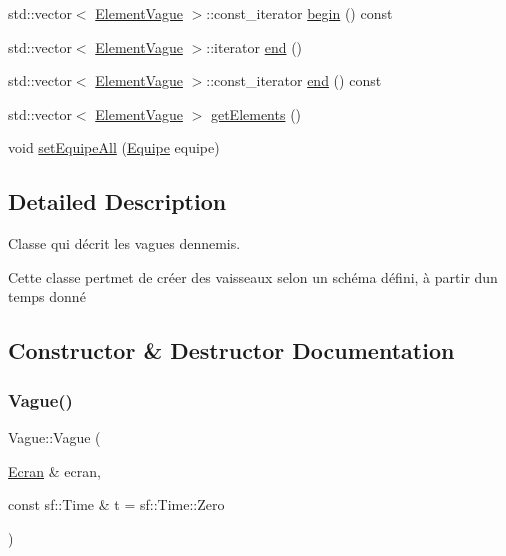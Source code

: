 \begin{DoxyCompactItemize}
\item 
std\+::vector$<$ \mbox{\hyperlink{struct_element_vague}{Element\+Vague}} $>$\+::const\+\_\+iterator \mbox{\hyperlink{class_vague_a5470d1e3e46fb8a79d1875f81aef528a}{begin}} () const
\item 
std\+::vector$<$ \mbox{\hyperlink{struct_element_vague}{Element\+Vague}} $>$\+::iterator \mbox{\hyperlink{class_vague_aef14ca0ef14911b98162038a81a06cf6}{end}} ()
\item 
std\+::vector$<$ \mbox{\hyperlink{struct_element_vague}{Element\+Vague}} $>$\+::const\+\_\+iterator \mbox{\hyperlink{class_vague_ad62bcc2e340ebffe8efba1e4b7f03150}{end}} () const
\item 
std\+::vector$<$ \mbox{\hyperlink{struct_element_vague}{Element\+Vague}} $>$ \mbox{\hyperlink{class_vague_ae7437097c10ed89cbd923f816450e334}{get\+Elements}} ()
\item 
void \mbox{\hyperlink{class_vague_aed7f0a70cc0d93ed686af4e100376974}{set\+Equipe\+All}} (\mbox{\hyperlink{constantes_8h_a08fa5554288d5031a8f3bb83cc04ee83}{Equipe}} equipe)
\end{DoxyCompactItemize}


\subsection{Detailed Description}
Classe qui décrit les vagues d\textquotesingle{}ennemis. 

Cette classe pertmet de créer des vaisseaux selon un schéma défini, à partir d\textquotesingle{}un temps donné 

\subsection{Constructor \& Destructor Documentation}
\mbox{\label{class_vague_ab897ad06f808c1242c26ea10d27026b3}} 
\subsubsection{\texorpdfstring{Vague()}{Vague()}}
{\footnotesize\ttfamily Vague\+::\+Vague (\begin{DoxyParamCaption}\item[{\mbox{\hyperlink{class_ecran}{Ecran}} \&}]{ecran,  }\item[{const sf\+::\+Time \&}]{t = {\ttfamily sf\+:\+:Time\+:\+:Zero} }\end{DoxyParamCaption})\hspace{0.3cm}{\ttfamily [explicit]}}



